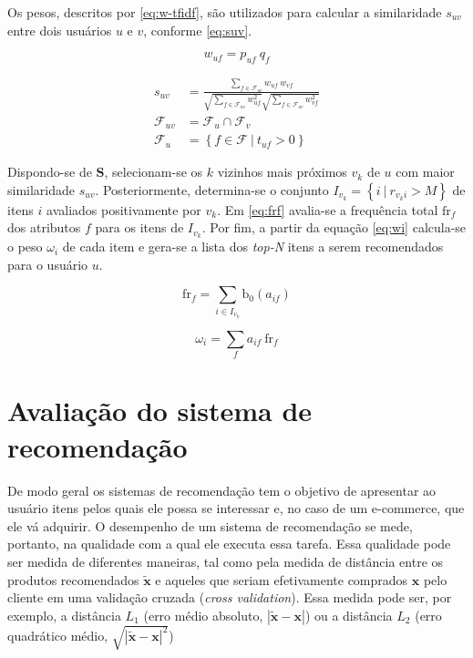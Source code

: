 Os pesos, descritos por \ref{eq:w-tfidf}, são utilizados para calcular a similaridade $s_{uv}$ entre dois usuários $u$ e $v$, conforme \ref{eq:suv}.

\begin{equation}
\label{eq:w-tfidf} 
    w_{uf} = p_{uf}~q_{f}
\end{equation} 


\begin{equation}
\label{eq:suv}
\begin{split}
    s_{uv} &= \frac{\sum\limits_{f \in \mathcal{F}_{uv}}{w_{uf}~w_{vf}}}{\sqrt{\sum\limits_{f \in \mathcal{F}_{uv}
    }w_{uf}^2} \sqrt{\sum\limits_{f \in \mathcal{F}_{uv}}w_{vf}^2}} \\
    \mathcal{F}_{uv} &= \mathcal{F}_u \cap \mathcal{F}_v \\
    \mathcal{F}_u &= \left\{ f \in \mathcal{F}~|~t_{uf} > 0 \right\}
\end{split}    
\end{equation} 

Dispondo-se de $\mathbf{S}$, selecionam-se os $k$ vizinhos mais próximos $v_k$ de $u$ com maior similaridade $s_{uv}$.  Posteriormente, determina-se o conjunto $I_{v_k} = \left\{ i ~|~ r_{v_ki} > M\right\}$ de itens $i$ avaliados positivamente por $v_k$. Em \ref{eq:frf} avalia-se a frequência total $\mathrm{fr}_f$ dos atributos $f$ para os itens de $I_{v_k}$. Por fim, a partir da equação \ref{eq:wi} calcula-se o peso $\omega_i$ de cada item e gera-se a lista dos \textit{top-N} itens a serem recomendados para o usuário $u$. 


\begin{equation}
\label{eq:frf} 
\mathrm{fr}_f = \sum_{i \in I_{v_k}}{\mathrm{b}_0\left(a_{if}\right)}
\end{equation} 

\begin{equation}
\label{eq:wi} 
    \omega_{i} = \sum_{f}{a_{if}~\mathrm{fr}_f}
\end{equation} 



\section{Avaliação do sistema de recomendação} %
\label{sec:avalia_o_do_sistema_de_recomenda_o}


De modo geral os sistemas de recomendação tem o objetivo de apresentar ao usuário itens pelos quais ele possa se interessar e, no caso de um e-commerce, que ele vá adquirir. O desempenho de um sistema de recomendação se mede, portanto, na qualidade com a qual ele executa essa tarefa. Essa qualidade pode ser medida de diferentes maneiras, tal como pela medida de distância entre os produtos recomendados $\widetilde{\mathbf{x}}$ e aqueles que seriam efetivamente comprados $\mathbf{x}$ pelo cliente em uma validação cruzada (\textit{cross validation}). Essa medida pode ser, por exemplo, a distância $L_1$ (erro médio absoluto, $\left|\widetilde{\mathbf{x}} - \mathbf{x}\right|$) ou a distância $L_2$ (erro quadrático médio,  $\sqrt{\left|\widetilde{\mathbf{x}} - \mathbf{x}\right|^2}$)


